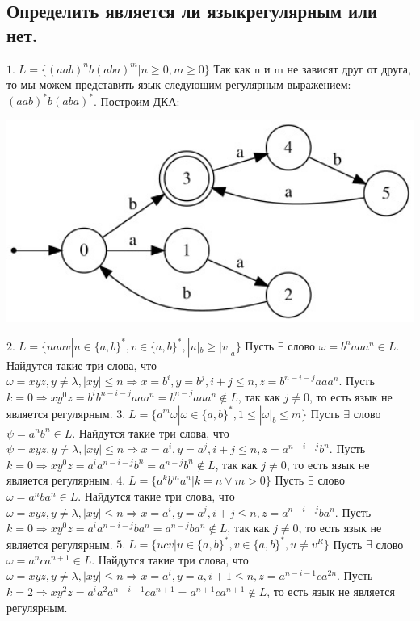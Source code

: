 \documentclass[a4paper,12pt]{article}
\begin{document}
\subsection*{Определить является ли языкрегулярным или нет.}
\Large $1.\;L = \{(aab)^nb(aba)^m|n \ge 0, m \ge 0\}$\newline
Так как n и m не зависят друг от друга, то мы можем представить язык следующим регулярным выражением: \newline $(aab)^*b(aba)^*$. Построим ДКА:
\begin{center}
\includegraphics[width=1.15\textwidth]{4_1}\newline
\end{center}
\Large $2.\;L = \{uaav|u \in \{a,b\}^*, v \in \{a,b\}^*, |u|_b \ge |v|_a\}$\newline
Пусть $\exists$ слово $\omega = b^naaa^n \in L$.  
Найдутся такие три слова, что $\omega = xyz, y \ne \lambda, |xy|\leq n \Rightarrow x = b^i, y = b^j, i+j \leq n, z = b^{n-i-j}aaa^n$. Пусть $k=0 \Rightarrow xy^0z=b^ib^{n-i-j}aaa^n = b^{n-j}aaa^n \notin L$, так как $j \ne 0$, то есть язык не является регулярным. \newline
\Large $3.\;L = \{a^m\omega|\omega \in \{a,b\}^*, 1 \le |\omega|_b \le m\}$\newline
Пусть $\exists$ слово $\psi = a^nb^n \in L$.  
Найдутся такие три слова, что $\psi = xyz, y \ne \lambda, |xy|\leq n \Rightarrow x = a^i, y = a^j, i+j \leq n, z = a^{n-i-j}b^n$. Пусть $k=0 \Rightarrow xy^0z=a^ia^{n-i-j}b^n = a^{n-j}b^n \notin L$, так как $j \ne 0$, то есть язык не является регулярным. \newline
\Large $4.\;L = \{a^kb^ma^n|k = n \vee m > 0\}$\newline
Пусть $\exists$ слово $\omega = a^nba^n \in L$.  
Найдутся такие три слова, что $\omega = xyz, y \ne \lambda, |xy|\leq n \Rightarrow x = a^i, y = a^j, i+j \leq n, z = a^{n-i-j}ba^n$. Пусть $k=0 \Rightarrow xy^0z=a^ia^{n-i-j}ba^n = a^{n-j}ba^n \notin L$, так как $j \ne 0$, то есть язык не является регулярным. \newline
\Large $5.\;L = \{ucv|u \in \{a,b\}^*, v \in \{a,b\}^*, u \ne v^R\}$\newline
Пусть $\exists$ слово $\omega = a^nca^{n+1} \in L$.  
Найдутся такие три слова, что $\omega = xyz, y \ne \lambda, |xy|\leq n \Rightarrow x = a^i, y = a, i+1 \leq n, z = a^{n-i-1}ca^{2n}$. Пусть $k=2 \Rightarrow xy^2z=a^ia^2a^{n-i-1}ca^{n+1} = a^{n+1}ca^{n+1} \notin L$, то есть язык не является регулярным. \newline
\end{document}
